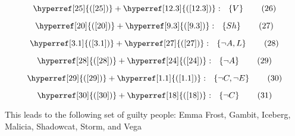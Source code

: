 \documentclass[a4paper]{article}
\newcommand{\refequation}[1]{\hyperref[#1]{(\ref{#1})}}
\begin{document}
\begin{equation}
\refequation{25} + \refequation{12.3}: \  \ \left\{ V \right\} \tag{26} \label{26}
\end{equation}

\begin{equation}
\refequation{20} + \refequation{9.3}: \  \ \left\{ Sh \right\} \tag{27} \label{27}
\end{equation}

\begin{equation}
\refequation{3.1} + \refequation{27}: \  \ \left\{ \lnot A , L \right\} \tag{28} \label{28}
\end{equation}

\begin{equation}
\refequation{28} + \refequation{24}: \  \ \left\{ \lnot A \right\} \tag{29} \label{29}
\end{equation}

\begin{equation}
\refequation{29} + \refequation{1.1}: \  \ \left\{ \lnot C, \lnot E \right\} \tag{30} \label{30}
\end{equation}

\begin{equation}
\refequation{30} + \refequation{18}: \  \ \left\{ \lnot C \right\} \tag{31} \label{31}
\end{equation}

This leads to the following set of guilty people: Emma Frost, Gambit, Iceberg, Malicia, Shadowcat, Storm, and Vega
\end{document}

